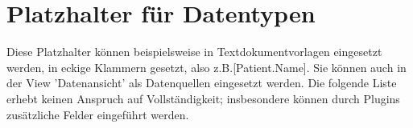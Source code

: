
\section{Platzhalter für Datentypen}
\label{Platzhalter}
Diese Platzhalter können beispielsweise in Textdokumentvorlagen eingesetzt
werden, in eckige Klammern gesetzt, also z.B.[Patient.Name].
Sie können auch in der View 'Datenansicht' als Datenquellen eingesetzt werden.
Die folgende Liste erhebt keinen Anspruch auf Vollständigkeit; insbesondere
können durch Plugins zusätzliche Felder eingeführt werden.
